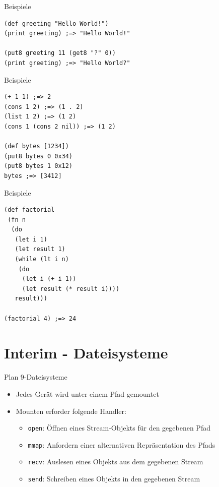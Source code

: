 \documentclass[presentation]{beamer}
\begin{document}
\begin{frame}[fragile,label=sec-3-3]{Beispiele}
 \begin{verbatim}
(def greeting "Hello World!")
(print greeting) ;=> "Hello World!"

(put8 greeting 11 (get8 "?" 0))
(print greeting) ;=> "Hello World?"
\end{verbatim}
\end{frame}

\begin{frame}[fragile,label=sec-3-4]{Beispiele}
 \begin{verbatim}
(+ 1 1) ;=> 2
(cons 1 2) ;=> (1 . 2)
(list 1 2) ;=> (1 2)
(cons 1 (cons 2 nil)) ;=> (1 2)

(def bytes [1234])
(put8 bytes 0 0x34)
(put8 bytes 1 0x12)
bytes ;=> [3412]
\end{verbatim}
\end{frame}

\begin{frame}[fragile,label=sec-3-5]{Beispiele}
 \begin{verbatim}
(def factorial
 (fn n
  (do
   (let i 1)
   (let result 1)
   (while (lt i n)
    (do
     (let i (+ i 1))
     (let result (* result i))))
   result)))

(factorial 4) ;=> 24
\end{verbatim}
\end{frame}

\section{Interim - Dateisysteme}
\label{sec-4}

\begin{frame}[fragile,label=sec-4-1]{Plan 9-Dateisysteme}
 \begin{itemize}
\item Jedes Gerät wird unter einem Pfad gemountet
\item Mounten erforder folgende Handler:
\begin{itemize}
\item \texttt{open}: Öffnen eines Stream-Objekts für den gegebenen Pfad
\item \texttt{mmap}: Anfordern einer alternativen Repräsentation des Pfads
\item \texttt{recv}: Auslesen eines Objekts aus dem gegebenen Stream
\item \texttt{send}: Schreiben eines Objekts in den gegebenen Stream
\end{itemize}
\end{itemize}
\end{frame}
\end{document}
